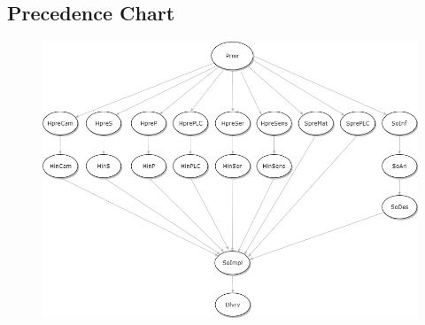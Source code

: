 \subsection{Precedence Chart}
\begin{figure}[h]
	\centering
	\includegraphics[width=\textwidth]{images/precedenceChart}
\end{figure}

